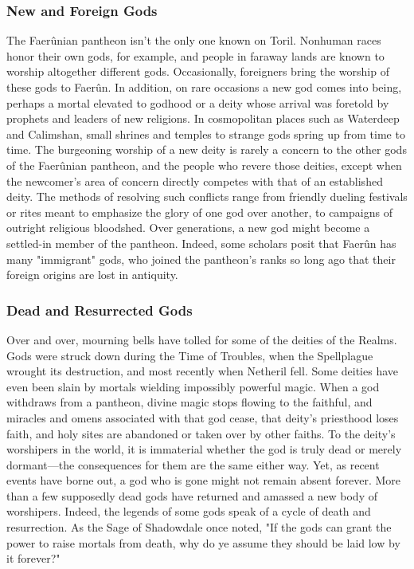 \documentclass[10pt,a4paper,twoside,twocolumn,openany,bg=print,nodeprecatedcode]{dndbook}
\begin{document}
\subsubsection{New and Foreign Gods}
The Faerûnian pantheon isn't the only one known on Toril. Nonhuman races honor their own gods, for example, and people in faraway lands are known to worship altogether different gods. Occasionally, foreigners bring the worship of these gods to Faerûn. In addition, on rare occasions a new god comes into being, perhaps a mortal elevated to godhood or a deity whose arrival was foretold by prophets and leaders of new religions. In cosmopolitan places such as Waterdeep and Calimshan, small shrines and temples to strange gods spring up from time to time.
The burgeoning worship of a new deity is rarely a concern to the other gods of the Faerûnian pantheon, and the people who revere those deities, except when the newcomer's area of concern directly competes with that of an established deity. The methods of resolving such conflicts range from friendly dueling festivals or rites meant to emphasize the glory of one god over another, to campaigns of outright religious bloodshed.
Over generations, a new god might become a settled-in member of the pantheon. Indeed, some scholars posit that Faerûn has many "immigrant" gods, who joined the pantheon's ranks so long ago that their foreign origins are lost in antiquity.
\subsubsection{Dead and Resurrected Gods}
Over and over, mourning bells have tolled for some of the deities of the Realms. Gods were struck down during the Time of Troubles, when the Spellplague wrought its destruction, and most recently when Netheril fell. Some deities have even been slain by mortals wielding impossibly powerful magic.
When a god withdraws from a pantheon, divine magic stops flowing to the faithful, and miracles and omens associated with that god cease, that deity's priesthood loses faith, and holy sites are abandoned or taken over by other faiths. To the deity's worshipers in the world, it is immaterial whether the god is truly dead or merely dormant—the consequences for them are the same either way. Yet, as recent events have borne out, a god who is gone might not remain absent forever. More than a few supposedly dead gods have returned and amassed a new body of worshipers. Indeed, the legends of some gods speak of a cycle of death and resurrection.
As the Sage of Shadowdale once noted, "If the gods can grant the power to raise mortals from death, why do ye assume they should be laid low by it forever?"
\end{document}

